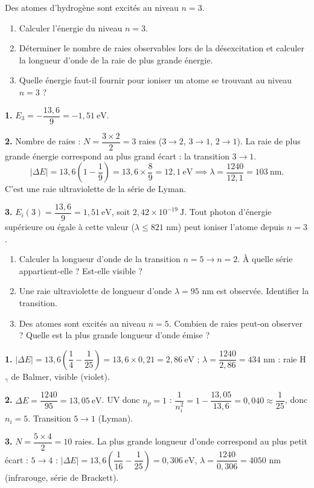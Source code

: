 \documentclass[11pt]{article}
\begin{document}
\begin{exoresolu}
Des atomes d'hydrogène sont excités au niveau $n = 3$.
\begin{enumerate}
\item Calculer l'énergie du niveau $n = 3$.
\item Déterminer le nombre de raies observables lors de la désexcitation et calculer la longueur d'onde de la raie de plus grande énergie.
\item Quelle énergie faut-il fournir pour ioniser un atome se trouvant au niveau $n = 3$ ?
\end{enumerate}
\tcblower
\textbf{1.} $E_3 = -\dfrac{13{,}6}{9} = -1{,}51\ \text{eV}$.

\textbf{2.} Nombre de raies : $N = \dfrac{3 \times 2}{2} = 3$ raies ($3\to2$, $3\to1$, $2\to1$). La raie de plus grande énergie correspond au plus grand écart : la transition $3 \to 1$.
\[ |\Delta E| = 13{,}6\left(1 - \frac{1}{9}\right) = 13{,}6 \times \frac{8}{9} = 12{,}1\ \text{eV} \implies \lambda = \frac{1240}{12{,}1} = 103\ \text{nm}. \]
C'est une raie ultraviolette de la série de Lyman.

\textbf{3.} $E_i(3) = \dfrac{13{,}6}{9} = 1{,}51\ \text{eV}$, soit $2{,}42\times 10^{-19}\ \text{J}$. Tout photon d'énergie supérieure ou égale à cette valeur ($\lambda \leq 821$ nm) peut ioniser l'atome depuis $n = 3$.
\end{exoresolu}

\begin{exercice}
\begin{enumerate}
\item Calculer la longueur d'onde de la transition $n = 5 \to n = 2$. À quelle série appartient-elle ? Est-elle visible ?
\item Une raie ultraviolette de longueur d'onde $\lambda = 95$ nm est observée. Identifier la transition.
\item Des atomes sont excités au niveau $n = 5$. Combien de raies peut-on observer ? Quelle est la plus grande longueur d'onde émise ?
\end{enumerate}
\end{exercice}

\begin{corrige}[Exercice n°1]
\textbf{1.} $|\Delta E| = 13{,}6\left(\dfrac{1}{4} - \dfrac{1}{25}\right) = 13{,}6 \times 0{,}21 = 2{,}86\ \text{eV}$ ; $\lambda = \dfrac{1240}{2{,}86} = 434$ nm : raie H$_\gamma$ de Balmer, visible (violet).

\textbf{2.} $\Delta E = \dfrac{1240}{95} = 13{,}05\ \text{eV}$. UV donc $n_p = 1$ : $\dfrac{1}{n_i^2} = 1 - \dfrac{13{,}05}{13{,}6} = 0{,}040 \approx \dfrac{1}{25}$, donc $n_i = 5$. Transition $5 \to 1$ (Lyman).

\textbf{3.} $N = \dfrac{5 \times 4}{2} = 10$ raies. La plus grande longueur d'onde correspond au plus petit écart : $5 \to 4$ : $|\Delta E| = 13{,}6\left(\dfrac{1}{16} - \dfrac{1}{25}\right) = 0{,}306\ \text{eV}$, $\lambda = \dfrac{1240}{0{,}306} = 4050$ nm (infrarouge, série de Brackett).
\end{corrige}
\end{document}
